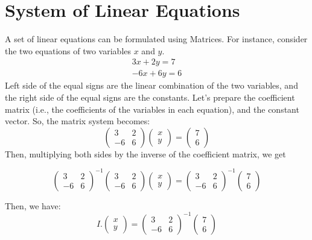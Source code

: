 \documentclass[conference,final,11pt,technote,onecolumn]{IEEEtran}\usepackage[]{graphicx}\usepackage[]{color}
\begin{document}
	\section{System of Linear Equations}
	\label{term:linear_systems}
A set of linear equations can be formulated using Matrices. For instance, consider the two equations of two variables $x$ and $y$.
\begin{eqnarray}
3x+2y = 7\\
-6x+6y = 6
\end{eqnarray}
 Left side of the equal signs are the linear combination of the two variables, and the right side of the equal signs are the constants. Let's prepare the coefficient matrix (i.e., the coefficients of the variables in each equation), and the constant vector. So, the matrix system becomes:
 \[
\begin{pmatrix}
3 & 2\\
-6 & 6
\end{pmatrix}\begin{pmatrix}
x\\
y
\end{pmatrix} = \begin{pmatrix}
7\\
6
\end{pmatrix}
 \]
Then, multiplying both sides by the inverse of the coefficient matrix, we get

 \[
\begin{pmatrix}
3 & 2\\
-6 & 6
\end{pmatrix}^{-1}\begin{pmatrix}
3 & 2\\
-6 & 6
\end{pmatrix}\begin{pmatrix}
x\\
y
\end{pmatrix} = \begin{pmatrix}
3 & 2\\
-6 & 6
\end{pmatrix}^{-1}\begin{pmatrix}
7\\
6
\end{pmatrix}
 \]

Then, we have:
 \[
I.\begin{pmatrix}
x\\
y
\end{pmatrix} = \begin{pmatrix}
3 & 2\\
-6 & 6
\end{pmatrix}^{-1}\begin{pmatrix}
7\\
6
\end{pmatrix}
 \]
\end{document}
